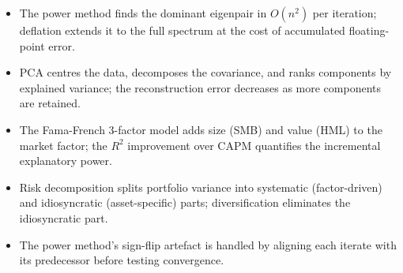 \begin{itemize}
    \item The power method finds the dominant eigenpair in
      $O(n^2)$ per iteration; deflation extends it to the full spectrum
      at the cost of accumulated floating-point error.
    \item PCA centres the data, decomposes the covariance, and ranks
      components by explained variance; the reconstruction error
      decreases as more components are retained.
    \item The Fama-French 3-factor model adds size (SMB) and value
      (HML) to the market factor; the $R^2$ improvement over CAPM
      quantifies the incremental explanatory power.
    \item Risk decomposition splits portfolio variance into
      systematic (factor-driven) and idiosyncratic (asset-specific)
      parts; diversification eliminates the idiosyncratic part.
    \item The power method's sign-flip artefact is handled by aligning
      each iterate with its predecessor before testing convergence.
\end{itemize}